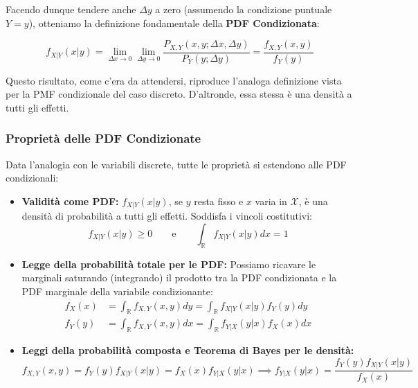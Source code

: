 Facendo dunque tendere anche $\Delta y$ a zero (assumendo la condizione puntuale $Y=y$), otteniamo la definizione fondamentale della \textbf{PDF Condizionata}:

\begin{equation}
\boxed{ f_{X|Y}(x|y) = \lim_{\Delta x \to 0} \lim_{\Delta y \to 0} \frac{P_{X,Y}(x,y; \Delta x, \Delta y)}{P_Y(y; \Delta y)} = \frac{f_{X,Y}(x,y)}{f_Y(y)} }
\end{equation}

Questo risultato, come c'era da attendersi, riproduce l'analoga definizione vista per la PMF condizionale del caso discreto. D'altronde, essa stessa è una densità a tutti gli effetti.

\subsubsection{Proprietà delle PDF Condizionate}
Data l'analogia con le variabili discrete, tutte le proprietà si estendono alle PDF condizionali:

\begin{itemize}
    \item \textbf{Validità come PDF:} $f_{X|Y}(x|y)$, se $y$ resta fisso e $x$ varia in $\mathcal{X}$, è una densità di probabilità a tutti gli effetti. Soddisfa i vincoli costitutivi:
    \begin{equation}
    f_{X|Y}(x|y) \ge 0 \qquad \text{e} \qquad \int_{\mathbb{R}} f_{X|Y}(x|y) dx = 1
    \end{equation}
    
    \item \textbf{Legge della probabilità totale per le PDF:} 
    Possiamo ricavare le marginali saturando (integrando) il prodotto tra la PDF condizionata e la PDF marginale della variabile condizionante:
    \begin{align}
    f_X(x) &= \int_{\mathbb{R}} f_{X,Y}(x,y) dy = \int_{\mathbb{R}} f_{X|Y}(x|y) f_Y(y) dy \\
    f_Y(y) &= \int_{\mathbb{R}} f_{X,Y}(x,y) dx = \int_{\mathbb{R}} f_{Y|X}(y|x) f_X(x) dx
    \end{align}

    \item \textbf{Leggi della probabilità composta e Teorema di Bayes per le densità:}
    \begin{equation}
    f_{X,Y}(x,y) = f_Y(y)f_{X|Y}(x|y) = f_X(x)f_{Y|X}(y|x) \implies f_{Y|X}(y|x) = \frac{f_Y(y)f_{X|Y}(x|y)}{f_X(x)}
    \end{equation}
\end{itemize}

